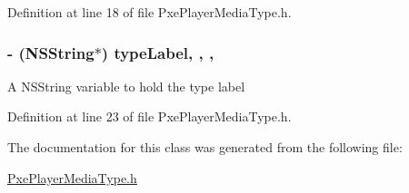 Definition at line 18 of file Pxe\-Player\-Media\-Type.\-h.

\hypertarget{interface_pxe_player_media_type_a7ec2c3313fed4481e66a9e43b42b352b}{
\subsubsection[{type\-Label}]{\setlength{\rightskip}{0pt plus 5cm}-\/ (N\-S\-String$\ast$) type\-Label\hspace{0.3cm}{\ttfamily [read]}, {\ttfamily [write]}, {\ttfamily [nonatomic]}, {\ttfamily [strong]}}}\label{interface_pxe_player_media_type_a7ec2c3313fed4481e66a9e43b42b352b}
A N\-S\-String variable to hold the type label 

Definition at line 23 of file Pxe\-Player\-Media\-Type.\-h.



The documentation for this class was generated from the following file\-:\begin{DoxyCompactItemize}
\item 
\hyperlink{_pxe_player_media_type_8h}{Pxe\-Player\-Media\-Type.\-h}\end{DoxyCompactItemize}
